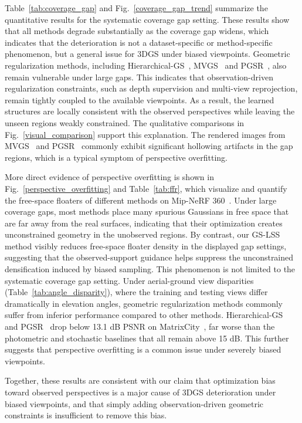 \documentclass[lettersize,journal]{IEEEtran}
\begin{document}
Table~\ref{tab:coverage_gap} and Fig.~\ref{coverage_gap_trend} summarize the quantitative results for the systematic coverage gap setting. 
These results show that all methods degrade substantially as the coverage gap widens,
which indicates that the deterioration is not a dataset-specific or method-specific phenomenon, but a general issue for 3DGS under biased viewpoints.
Geometric regularization methods, including Hierarchical-GS~\cite{hierarchical}, MVGS~\cite{mvgs} and PGSR~\cite{pgsr}, also remain vulnerable under large gaps.
This indicates that observation-driven regularization constraints, such as depth supervision and multi-view reprojection, remain tightly coupled to the available viewpoints. As a result, the learned structures are locally consistent with the observed perspectives while leaving the unseen regions weakly constrained. 
The qualitative comparisons in Fig.~\ref{visual_comparison} support this explanation. The rendered images from MVGS~\cite{mvgs} and PGSR~\cite{pgsr} commonly exhibit significant hollowing artifacts in the gap regions, which is a typical symptom of perspective overfitting.

More direct evidence of perspective overfitting is shown in Fig.~\ref{perspective_overfitting} and Table~\ref{tab:ffr}, which visualize and quantify the free-space floaters of different methods on Mip-NeRF 360~\cite{mipnerf360}.
Under large coverage gaps, most methods place many spurious Gaussians in free space that are far away from the real surfaces, indicating that their optimization creates unconstrained geometry in the unobserved regions.
By contrast, our GS-LSS method visibly reduces free-space floater density in the displayed gap settings, suggesting that the observed-support guidance helps suppress the unconstrained densification induced by biased sampling.
This phenomenon is not limited to the systematic coverage gap setting. Under aerial-ground view disparities (Table~\ref{tab:angle_disparity}), where the training and testing views differ dramatically in elevation angles, geometric regularization methods commonly suffer from inferior performance compared to other methods. Hierarchical-GS~\cite{hierarchical} and PGSR~\cite{pgsr} drop below 13.1 dB PSNR on MatrixCity~\cite{matrixcity}, far worse than the photometric and stochastic baselines that all remain above 15 dB. This further suggests that perspective overfitting is a common issue under severely biased viewpoints.

Together, these results are consistent with our claim that optimization bias toward observed perspectives is a major cause of 3DGS deterioration under biased viewpoints, and that simply adding observation-driven geometric constraints is insufficient to remove this bias.
\end{document}
